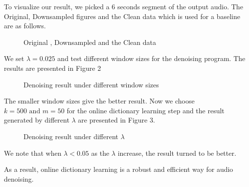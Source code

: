 \documentclass[UTF8]{article}
\begin{document}
To visualize our result, we picked a 6 seconds segment of the output audio.
The Original, Downsampled figures and the Clean data which is used for a baseline are as follows.
\begin{figure}[H]
    \centering
    \caption{Original , Downsampled and the Clean data}
\end{figure}

We set $\lambda = 0.025$ and test different window sizes for the denoising program. The results are presented in Figure 2

\begin{figure}[H]
    \centering
    \caption{Denoising result under different window sizes}
\end{figure}

The smaller window sizes give the better result. Now we choose $k = 500 \text{ and } m = 50$ for the online dictionary learning step and the result generated by different $\lambda$ are presented in Figure 3.


\begin{figure}[H]
    \centering
    \caption{Denoising result under different $\lambda$}
\end{figure}

We note that when $\lambda < 0.05$ as the $\lambda$ increase, the result turned to be better.

As a result, online dictionary learning is a robust and efficient way for audio denoising.



\nocite{*}
\end{document}
